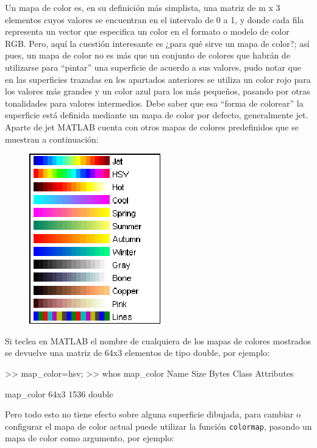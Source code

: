 Un mapa de color es, en su definición más simplista, una matriz de m x 3
elementos cuyos valores se encuentran en el intervalo de 0 a 1, y donde
cada fila representa un vector que especifica un color en el formato o
modelo de color RGB. Pero, aquí la cuestión interesante es ¿para qué
sirve un mapa de color?; así pues, un mapa de color no es más que un
conjunto de colores que habrán de utilizarse para ``pintar'' una
superficie de acuerdo a sus valores, pudo notar que en las superficies
trazadas en los apartados anteriores se utiliza un color rojo para los
valores más grandes y un color azul para los más pequeños, pasando por
otras tonalidades para valores intermedios. Debe saber que esa ``forma
de colorear'' la superficie está definida mediante un mapa de color por
defecto, generalmente jet. Aparte de jet MATLAB cuenta con otros mapas
de colores predefinidos que se muestran a continuación:

\begin{figure}[htbp]
\centering
\includegraphics{images/ch4/img_4_9.png}
\caption{}
\end{figure}

Si teclea en MATLAB el nombre de cualquiera de los mapas de colores
mostrados se devuelve una matriz de 64x3 elementos de tipo double, por
ejemplo:

\begin{matlab}
>> map_color=hsv;
>> whos map_color
  Name            Size            Bytes  Class     Attributes

  map_color      64x3              1536  double          
\end{matlab}

Pero todo esto no tiene efecto sobre alguna superficie dibujada, para
cambiar o configurar el mapa de color actual puede utilizar la función
\texttt{colormap}, pasando un mapa de color como argumento, por ejemplo:


